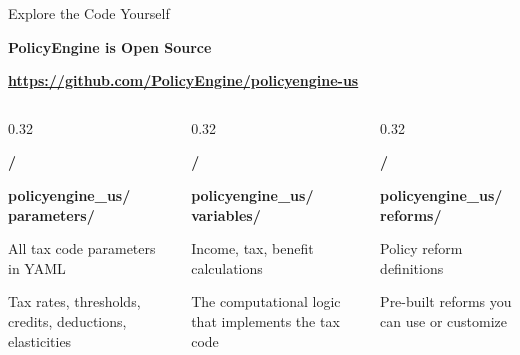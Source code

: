 \documentclass[11pt,aspectratio=169]{beamer}
\begin{document}
\begin{frame}{Explore the Code Yourself}
\begin{center}
\Large{\textbf{PolicyEngine is Open Source}}
\end{center}

\vspace{0.3cm}

\begin{center}
\textcolor{peteal}{\textbf{\large \url{https://github.com/PolicyEngine/policyengine-us}}}
\end{center}

\vspace{0.4cm}

\begin{columns}
\begin{column}{0.32\textwidth}
\begin{center}
\textcolor{policygreen}{\Large \textbf{/}}

\vspace{0.2cm}
\textbf{policyengine\_us/\\parameters/}

\vspace{0.2cm}
\small
All tax code parameters in YAML

Tax rates, thresholds, credits, deductions, elasticities
\end{center}
\end{column}

\begin{column}{0.32\textwidth}
\begin{center}
\textcolor{taxblue}{\Large \textbf{/}}

\vspace{0.2cm}
\textbf{policyengine\_us/\\variables/}

\vspace{0.2cm}
\small
Income, tax, benefit calculations

The computational logic that implements the tax code
\end{center}
\end{column}

\begin{column}{0.32\textwidth}
\begin{center}
\textcolor{peteal}{\Large \textbf{/}}

\vspace{0.2cm}
\textbf{policyengine\_us/\\reforms/}

\vspace{0.2cm}
\small
Policy reform definitions

Pre-built reforms you can use or customize
\end{center}
\end{column}
\end{columns}

\vspace{0.4cm}

\end{frame}
\end{document}
